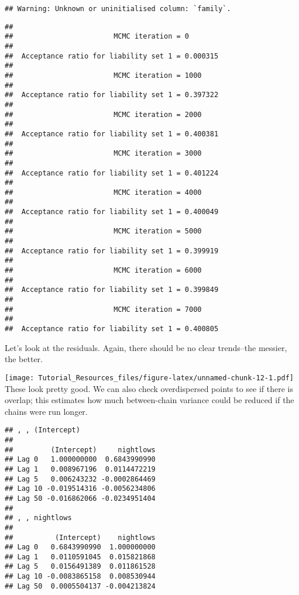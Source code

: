 \documentclass[
]{article}
\newenvironment{Shaded}{\begin{snugshade}}{\end{snugshade}}
\newcommand{\FloatTok}[1]{\textcolor[rgb]{0.00,0.00,0.81}{#1}}
\newcommand{\FunctionTok}[1]{\textcolor[rgb]{0.13,0.29,0.53}{\textbf{#1}}}
\newcommand{\NormalTok}[1]{#1}
\newcommand{\SpecialCharTok}[1]{\textcolor[rgb]{0.81,0.36,0.00}{\textbf{#1}}}
\begin{document}
\begin{verbatim}
## Warning: Unknown or uninitialised column: `family`.
\end{verbatim}

\begin{verbatim}
## 
##                        MCMC iteration = 0
## 
##  Acceptance ratio for liability set 1 = 0.000315
## 
##                        MCMC iteration = 1000
## 
##  Acceptance ratio for liability set 1 = 0.397322
## 
##                        MCMC iteration = 2000
## 
##  Acceptance ratio for liability set 1 = 0.400381
## 
##                        MCMC iteration = 3000
## 
##  Acceptance ratio for liability set 1 = 0.401224
## 
##                        MCMC iteration = 4000
## 
##  Acceptance ratio for liability set 1 = 0.400049
## 
##                        MCMC iteration = 5000
## 
##  Acceptance ratio for liability set 1 = 0.399919
## 
##                        MCMC iteration = 6000
## 
##  Acceptance ratio for liability set 1 = 0.399849
## 
##                        MCMC iteration = 7000
## 
##  Acceptance ratio for liability set 1 = 0.400805
\end{verbatim}

Let's look at the residuals. Again, there should be no clear trends--the
messier, the better.

\begin{Shaded}
\end{Shaded}

\texttt{[image: Tutorial\_Resources\_files/figure-latex/unnamed-chunk-12-1.pdf]}
These look pretty good. We can also check overdispersed points to see if
there is overlap; this estimates how much between-chain variance could
be reduced if the chains were run longer.

\begin{Shaded}
\end{Shaded}

\begin{verbatim}
## , , (Intercept)
## 
##         (Intercept)     nightlows
## Lag 0   1.000000000  0.6843990990
## Lag 1   0.008967196  0.0114472219
## Lag 5   0.006243232 -0.0002864469
## Lag 10 -0.019514316 -0.0056234806
## Lag 50 -0.016862066 -0.0234951404
## 
## , , nightlows
## 
##          (Intercept)    nightlows
## Lag 0   0.6843990990  1.000000000
## Lag 1   0.0110591045  0.015821868
## Lag 5   0.0156491389  0.011861528
## Lag 10 -0.0083865158  0.008530944
## Lag 50  0.0005504137 -0.004213824
\end{verbatim}
\end{document}
